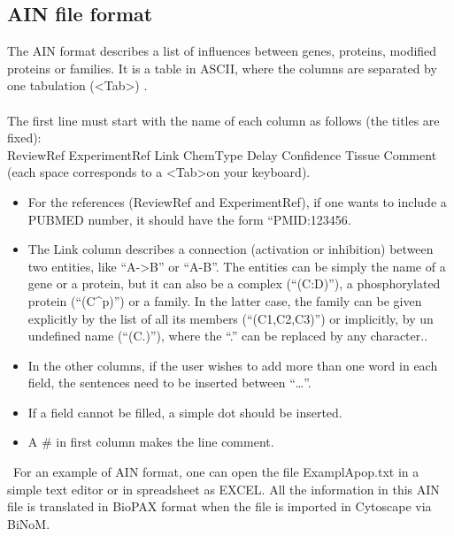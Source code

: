 \subsection{AIN file format} \label{AIN_file_format}
The AIN format describes a list of influences between genes, proteins, modified proteins or families. It is a table in ASCII, where the columns are separated by one tabulation (\textless Tab\textgreater) .\\\\
The first line must start with the name of each column as follows (the titles are fixed):\\
ReviewRef ExperimentRef Link ChemType Delay Confidence Tissue Comment\\
(each space corresponds to a \textless Tab\textgreater on your keyboard).
\begin{itemize}
\item For the references (ReviewRef and ExperimentRef), if one wants to include a PUBMED number, it should have the form “PMID:123456.
\item The Link column describes a connection (activation or inhibition) between two entities, like “A-\textgreater B” or “A-\textbar B”. The entities can be simply the name of a gene or a protein, but it can also be a complex (“(C:D)”), a phosphorylated protein (“(C\textasciicircum p)”) or a family. In the latter case, the family can be given explicitly by the list of all its members (“(C1,C2,C3)”) or implicitly, by un undefined name (“(C.)”), where the “.” can be replaced by any character..
\item In the other columns, if the user wishes to add more than one word in each field, the sentences need to be inserted between “…”.
\item If a field cannot be filled, a simple dot should be inserted.
\item A \# in first column makes the line comment.
\end{itemize}\
For an example of AIN format, one can open the file ExamplApop.txt in a simple text editor or in spreadsheet as EXCEL. All the information in this AIN file is translated in BioPAX format when the file is imported in Cytoscape via BiNoM.

